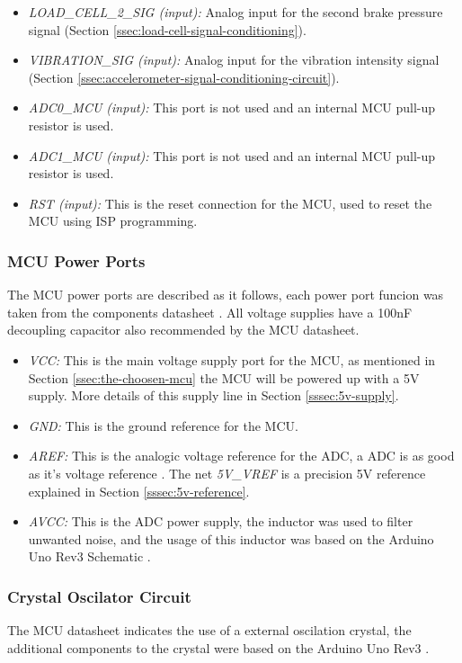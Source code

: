 \begin{itemize}
					\item \textit{LOAD_CELL_2_SIG (input):} Analog input for the second brake pressure signal (Section \ref{ssec:load-cell-signal-conditioning}).\label{itm:mcu-port-load-cell-2-sig} 
					\item \textit{VIBRATION_SIG (input):} Analog input for the vibration intensity signal (Section \ref{ssec:accelerometer-signal-conditioning-circuit}).\label{itm:mcu-port-vibration-sig}
					\item \textit{ADC0_MCU (input):} This port is not used and an internal MCU pull-up resistor is used.\label{itm:mcu-port-adc0-mcu}
					\item \textit{ADC1_MCU (input):} This port is not used and an internal MCU pull-up resistor is used.\label{itm:mcu-port-adc1-mcu}
					\item \textit{RST (input):} This is the reset connection for the MCU, used to reset the MCU using ISP programming.\label{itm:mcu-port-rst}
				\end{itemize}
		
			\subsubsection{MCU Power Ports}\label{sssec:mcu-power-ports}
				The MCU power ports are described as it follows, each power port funcion was taken from the components datasheet \cite{atmega328p-datasheet}. All voltage supplies have a 100nF decoupling capacitor also recommended by the MCU datasheet.

				\begin{itemize}
					\item \textit{VCC: } This is the main voltage supply port for the MCU, as mentioned in Section \ref {ssec:the-choosen-mcu} the MCU will be powered up with a 5V supply. More details of this supply line in Section \ref{sssec:5v-supply}.\label{itm:mcu-vcc}
					\item \textit{GND: } This is the ground reference for the MCU.\label{itm:mcu-gnd}
					\item \textit{AREF: } This is the analogic voltage reference for the ADC, a ADC is as good as it's voltage reference \cite{adc-good}. The net \textit{5V_VREF} is a precision 5V reference explained in Section \ref{sssec:5v-reference}.\label{itm:mcu-aref}
					\item \textit{AVCC: } This is the ADC power supply, the inductor was used to filter unwanted noise, and the usage of this inductor was based on the Arduino Uno Rev3 Schematic \cite{arduino-rev3-schematic}.\label{mcu-avcc}
				\end{itemize}

			\subsubsection{Crystal Oscilator Circuit}\label{sssec:mcu-crystal-oscilator}

				The MCU datasheet indicates the use of a external oscilation crystal, the additional components to the crystal were based on the Arduino Uno Rev3 \cite{arduino-rev3-schematic}.